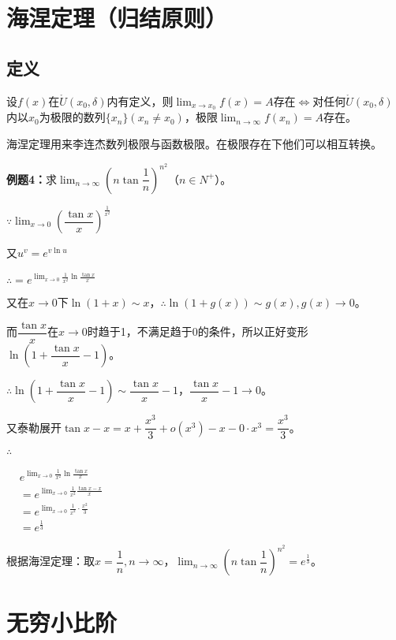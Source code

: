 \documentclass[UTF8]{ctexart}
\begin{document}
\section{海涅定理（归结原则）}

\subsection{定义}

设$f(x)$在$\mathring{U}(x_0,\delta)$内有定义，则$\lim_{x\to x_0}f(x)=A$存在$\Leftrightarrow$对任何$\mathring{U}(x_0,\delta)$内以$x_0$为极限的数列$\{x_n\}(x_n\neq x_0)$，极限$\lim_{n\to\infty}f(x_n)=A$存在。

海涅定理用来李连杰数列极限与函数极限。在极限存在下他们可以相互转换。

\textbf{例题4：}求$\lim_{n\to\infty}\left(n\tan\dfrac{1}{n}\right)^{n^2}$（$n\in N^+$）。

$\because \lim_{x\to 0}\left(\dfrac{\tan x}{x}\right)^{\frac{1}{x^2}}$

又$u^v=e^{v\ln u}$

$\therefore =e^{\lim_{x\to 0}\frac{1}{x^2}\ln\frac{\tan x}{x}}$

又在$x\to 0$下$\ln (1+x)\sim x$，$\therefore \ln(1+g(x))\sim g(x),g(x)\to 0$。

而$\dfrac{\tan x}{x}$在$x\to 0$时趋于1，不满足趋于0的条件，所以正好变形$\ln\left(1+\dfrac{\tan x}{x}-1\right)$。

$\therefore \ln\left(1+\dfrac{\tan x}{x}-1\right)\sim\dfrac{\tan x}{x}-1$，$\dfrac{\tan x}{x}-1\to 0$。

又泰勒展开$\tan x-x=x+\dfrac{x^3}{3}+o(x^3)-x-0\cdot x^3=\dfrac{x^3}{3}$。

$\therefore$ \bigskip

$
\begin{aligned}
    & e^{\lim_{x\to 0}\frac{1}{x^2}\ln\frac{\tan x}{x}} \\
    & =e^{\lim_{x\to 0}\frac{1}{x^2}\frac{\tan x-x}{x}} \\
    & =e^{\lim_{x\to 0}\frac{1}{x^2}\cdot\frac{x^2}{3}} \\
    & = e^{\frac{1}{3}}
\end{aligned}
$

根据海涅定理：取$x=\dfrac{1}{n},n\to\infty$，$\lim_{n\to\infty}\left(n\tan\dfrac{1}{n}\right)^{n^2}=e^{\frac{1}{3}}$。

\section{无穷小比阶}
\end{document}

